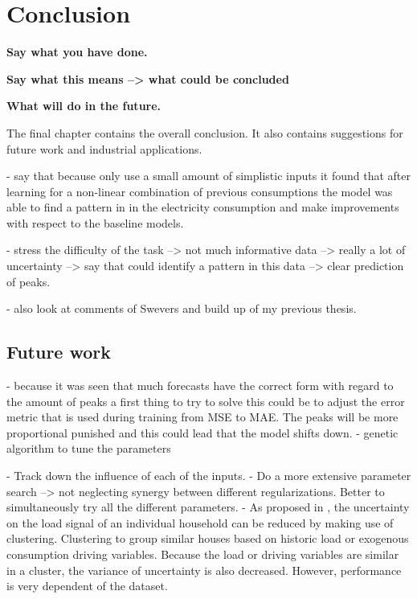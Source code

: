 \chapter{Conclusion}
\label{cha:conclusion}
\textbf{Say what you have done.}

\textbf{Say what this means --> what could be concluded}

\textbf{What will do in the future.}


The final chapter contains the overall conclusion. It also contains
suggestions for future work and industrial applications.

- say that because only use a small amount of simplistic inputs it found that after learning for a non-linear combination of previous consumptions the model was able to find a pattern in in the electricity consumption and make improvements with respect to the baseline models.

- stress the difficulty of the task --> not much informative data --> really a lot of uncertainty --> say that could identify a pattern in this data --> clear prediction of peaks.

- also look at comments of Swevers and build up of my previous thesis.

\section{Future work}
- because it was seen that much forecasts have the correct form with regard to the amount of peaks a first thing to try to solve this could be to adjust the error metric that is used during training from MSE to MAE. The peaks will be more proportional punished and this could lead that the model shifts down. 
- genetic algorithm to tune the parameters

- Track down the influence of each of the inputs.
- Do a more extensive parameter search --> not neglecting synergy between different regularizations. Better to simultaneously try all the different parameters.
- As proposed in \cite{Shi2018}, the uncertainty on the load signal of an individual household can be reduced by making use of clustering.  Clustering to group similar houses based on historic load or exogenous consumption driving variables. Because the load or driving variables are similar in a cluster, the variance of uncertainty is also decreased. However, performance is very dependent of the dataset.

